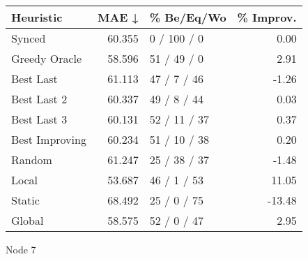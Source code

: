 \begin{tabular}{lrlr}
\toprule
\textbf{Heuristic} & \textbf{MAE ↓} & \textbf{\% Be/Eq/Wo} & \textbf{\% Improv.} \\
\midrule
            Synced &         60.355 &          0 / 100 / 0 &                0.00 \\
     Greedy Oracle &         58.596 &          51 / 49 / 0 &                2.91 \\
         Best Last &         61.113 &          47 / 7 / 46 &               -1.26 \\
       Best Last 2 &         60.337 &          49 / 8 / 44 &                0.03 \\
       Best Last 3 &         60.131 &         52 / 11 / 37 &                0.37 \\
    Best Improving &         60.234 &         51 / 10 / 38 &                0.20 \\
            Random &         61.247 &         25 / 38 / 37 &               -1.48 \\
             Local &         53.687 &          46 / 1 / 53 &               11.05 \\
            Static &         68.492 &          25 / 0 / 75 &              -13.48 \\
            Global &         58.575 &          52 / 0 / 47 &                2.95 \\
\bottomrule
\end{tabular}
\caption{Node 7}
\label{tab:non_lr05_le2_bs2_7}

